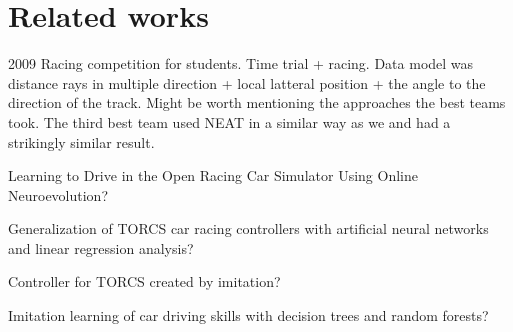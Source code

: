 


\section{Related works}

2009 Racing competition \cite{racingChamp2009} for students. Time trial + racing. Data model was distance rays in multiple direction + local latteral position + the angle to the direction of the track. Might be worth mentioning the approaches the best teams took. The third best team used NEAT in a similar way as we and had a strikingly similar result.

Learning to Drive in the Open Racing Car Simulator Using Online Neuroevolution?

Generalization of TORCS car racing controllers with artificial neural networks and linear regression analysis?

Controller for TORCS created by imitation?

Imitation learning of car driving skills with decision trees and random forests?
















